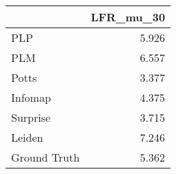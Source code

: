 \begin{tabular}{lr}
\toprule
{} & LFR_mu_30 \\
\midrule
PLP          &     5.926 \\
PLM          &     6.557 \\
Potts        &     3.377 \\
Infomap      &     4.375 \\
Surprise     &     3.715 \\
Leiden       &     7.246 \\
Ground Truth &     5.362 \\
\bottomrule
\end{tabular}
